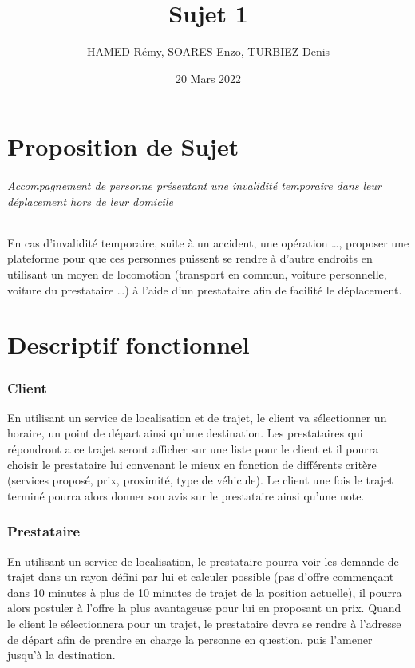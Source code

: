 \documentclass[a4paper,12pt]{article}
\title{Sujet 1}
\author{HAMED Rémy, SOARES Enzo, TURBIEZ Denis}
\date{20 Mars 2022}
\begin{document}
\maketitle
\newpage

\tableofcontents

\newpage
\part{Proposition de Sujet}

\paragraph{Accompagnement de personne présentant une invalidité temporaire dans leur déplacement hors de leur domicile}
En cas d'invalidité temporaire, suite à un accident, une opération …, proposer une plateforme pour que ces personnes puissent se rendre à d'autre endroits en utilisant un moyen de locomotion (transport en commun, voiture personnelle, voiture du prestataire …) à l'aide d'un prestataire afin de facilité le déplacement.

\newpage
\part{Descriptif fonctionnel}

\section{Client}
En utilisant un service de localisation et de trajet, le client va sélectionner un horaire, un point de départ ainsi qu'une destination. Les prestataires qui répondront a ce trajet seront afficher sur une liste pour le client et il pourra choisir le prestataire lui convenant le mieux en fonction de différents critère (services proposé, prix, proximité, type de véhicule).
Le client une fois le trajet terminé pourra alors donner son avis sur le prestataire ainsi qu'une note.

\section{Prestataire}
En utilisant un service de localisation, le prestataire pourra voir les demande de trajet dans un rayon défini par lui et calculer possible (pas d'offre commençant dans 10 minutes à plus de 10 minutes de trajet de la position actuelle), il pourra alors postuler à l'offre la plus avantageuse pour lui en proposant un prix. Quand le client le sélectionnera pour un trajet, le prestataire devra se rendre à l'adresse de départ afin de prendre en charge la personne en question, puis l'amener jusqu'à la destination.
\end{document}
